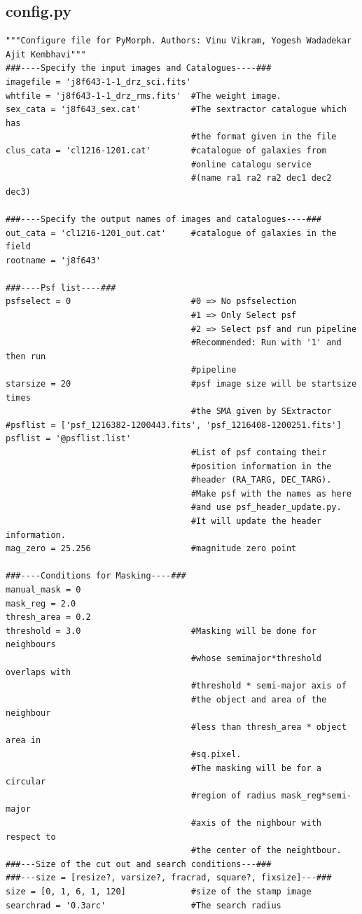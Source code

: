 \documentclass[a4paper,12pt]{article}
\begin{document}
\subsection{config.py}
\begin{footnotesize}
\begin{verbatim}
"""Configure file for PyMorph. Authors: Vinu Vikram, Yogesh Wadadekar Ajit Kembhavi"""
###----Specify the input images and Catalogues----###
imagefile = 'j8f643-1-1_drz_sci.fits'
whtfile = 'j8f643-1-1_drz_rms.fits'  #The weight image. 
sex_cata = 'j8f643_sex.cat'          #The sextractor catalogue which has 
                                     #the format given in the file
clus_cata = 'cl1216-1201.cat'        #catalogue of galaxies from
                                     #online catalogu service
                                     #(name ra1 ra2 ra2 dec1 dec2 dec3)

###----Specify the output names of images and catalogues----###
out_cata = 'cl1216-1201_out.cat'     #catalogue of galaxies in the field
rootname = 'j8f643'

###----Psf list----###
psfselect = 0                        #0 => No psfselection
                                     #1 => Only Select psf 
                                     #2 => Select psf and run pipeline
                                     #Recommended: Run with '1' and then run
                                     #pipeline
starsize = 20                        #psf image size will be startsize times 
                                     #the SMA given by SExtractor
#psflist = ['psf_1216382-1200443.fits', 'psf_1216408-1200251.fits']
psflist = '@psflist.list'
                                     #List of psf containg their 
                                     #position information in the 
                                     #header (RA_TARG, DEC_TARG). 
                                     #Make psf with the names as here 
                                     #and use psf_header_update.py. 
                                     #It will update the header information.
mag_zero = 25.256                    #magnitude zero point

###----Conditions for Masking----###
manual_mask = 0
mask_reg = 2.0
thresh_area = 0.2
threshold = 3.0                      #Masking will be done for neighbours 
                                     #whose semimajor*threshold overlaps with 
                                     #threshold * semi-major axis of 
                                     #the object and area of the neighbour 
                                     #less than thresh_area * object area in
                                     #sq.pixel. 
                                     #The masking will be for a circular 
                                     #region of radius mask_reg*semi-major 
                                     #axis of the nighbour with respect to 
                                     #the center of the neightbour.
###---Size of the cut out and search conditions---###
###---size = [resize?, varsize?, fracrad, square?, fixsize]---###
size = [0, 1, 6, 1, 120]             #size of the stamp image
searchrad = '0.3arc'                 #The search radius  


\end{verbatim}
\end{footnotesize}
\end{document}
